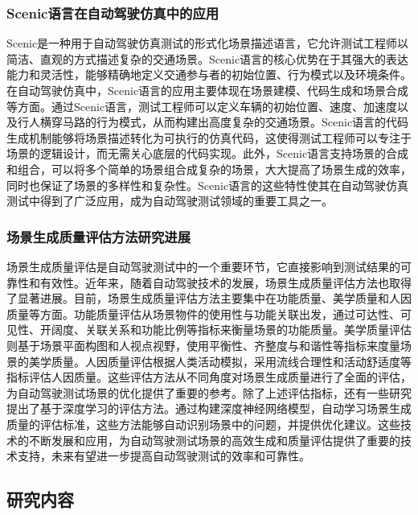 \documentclass{article}
\begin{document}
\subsubsection{Scenic语言在自动驾驶仿真中的应用}
Scenic是一种用于自动驾驶仿真测试的形式化场景描述语言，它允许测试工程师以简洁、直观的方式描述复杂的交通场景。Scenic语言的核心优势在于其强大的表达能力和灵活性，能够精确地定义交通参与者的初始位置、行为模式以及环境条件。在自动驾驶仿真中，Scenic语言的应用主要体现在场景建模、代码生成和场景合成等方面。通过Scenic语言，测试工程师可以定义车辆的初始位置、速度、加速度以及行人横穿马路的行为模式，从而构建出高度复杂的交通场景。Scenic语言的代码生成机制能够将场景描述转化为可执行的仿真代码，这使得测试工程师可以专注于场景的逻辑设计，而无需关心底层的代码实现。此外，Scenic语言支持场景的合成和组合，可以将多个简单的场景组合成复杂的场景，大大提高了场景生成的效率，同时也保证了场景的多样性和复杂性。Scenic语言的这些特性使其在自动驾驶仿真测试中得到了广泛应用，成为自动驾驶测试领域的重要工具之一。

\subsubsection{场景生成质量评估方法研究进展}
场景生成质量评估是自动驾驶测试中的一个重要环节，它直接影响到测试结果的可靠性和有效性。近年来，随着自动驾驶技术的发展，场景生成质量评估方法也取得了显著进展。目前，场景生成质量评估方法主要集中在功能质量、美学质量和人因质量等方面。功能质量评估从场景物件的使用性与功能关联出发，通过可达性、可见性、开阔度、关联关系和功能比例等指标来衡量场景的功能质量。美学质量评估则基于场景平面构图和人视点视野，使用平衡性、齐整度与和谐性等指标来度量场景的美学质量。人因质量评估根据人类活动模拟，采用流线合理性和活动舒适度等指标评估人因质量。这些评估方法从不同角度对场景生成质量进行了全面的评估，为自动驾驶测试场景的优化提供了重要的参考。除了上述评估指标，还有一些研究提出了基于深度学习的评估方法。通过构建深度神经网络模型，自动学习场景生成质量的评估标准，这些方法能够自动识别场景中的问题，并提供优化建议。这些技术的不断发展和应用，为自动驾驶测试场景的高效生成和质量评估提供了重要的技术支持，未来有望进一步提高自动驾驶测试的效率和可靠性。


\subsection{研究内容}
\end{document}
